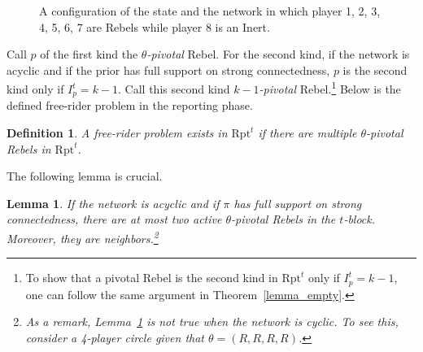 \documentclass[12pt,letter]{article}
\newcommand{\Omicron}{\mathrm{Rpt}}
\newtheorem{lemma}{Lemma}[section]
\newtheorem{definition}{Definition}[section]
\theoremstyle{definition}
\theoremstyle{remark}
\theoremstyle{claim}
\begin{document}
\begin{figure}


\begin{center}
\end{center}
\caption{A configuration of the state and the network in which player 1, 2, 3, 4, 5, 6, 7 are Rebels while player 8 is an Inert.}
\label{fig:k-1_pivotal}
\end{figure}

Call $p$ of the first kind the \textit{$\theta$-pivotal} Rebel. For the second kind, if the network is acyclic and if the prior has full support on strong connectedness, $p$ is the second kind only if $I^{t}_p=k-1$. Call this second kind \textit{$k-1$-pivotal} Rebel.\footnote{To show that a pivotal Rebel is the second kind in $\Omicron^{t}$ only if $I^{t}_p=k-1$, one can follow the same argument in Theorem~\ref{lemma_empty}.} Below is the defined free-rider problem in the reporting phase.

\begin{definition}
A free-rider problem exists in $\Omicron^t$ if there are multiple $\theta$-pivotal Rebels in $\Omicron^t$.
\end{definition}



The following lemma is crucial. 
\begin{lemma}
\label{lemma_at_most_two_nodes}
If the network is acyclic and if $\pi$ has full support on strong connectedness, there are at most two active $\theta$-pivotal Rebels in the $t$-block. Moreover, they are neighbors.\footnote{As a remark, Lemma~\ref{lemma_at_most_two_nodes} is not true when the network is cyclic. To see this, consider a 4-player circle given that $\theta=(R,R,R,R)$.}
\end{lemma}
\end{document}
